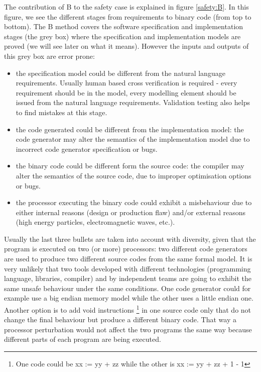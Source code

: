 The contribution of B to the safety case is explained in figure \ref{safety:B}. In this figure, we see the different stages from requirements to binary code (from top to bottom). The B method covers the software specification and implementation stages (the grey box) where the specification and implementation models are proved (we will see later on what it means). However the inputs and outputs of this grey box are error prone:
\begin{itemize}
    \item the specification model could be different from the natural language requirements. Usually human based cross verification is required - every requirement should be in the model, every modelling element should be issued from the natural language requirements. Validation testing also helps to find mistakes at this stage.
    \item the code generated could be different from the implementation model: the code generator may alter the semantics of the implementation model due to incorrect code generator specification or bugs.
    \item the binary code could be different form the source code: the compiler may alter the semantics of the source code, due to improper optimisation options or bugs.
    \item the processor executing the binary code could exhibit a misbehaviour due to either internal reasons (design or production flaw) and/or external reasons (high energy particles, electromagnetic waves, etc.).\\
\end{itemize}

Usually the last three bullets are taken into account with diversity, given that the program is executed on two (or more) processors: two different code generators are used to produce two different source codes from the same formal model. It is very unlikely that two tools developed with different technologies (programming language, libraries, compiler) and by independent teams are going to exhibit the same unsafe behaviour under the same conditions. One code generator could for example use a big endian memory model while the other uses a little endian one. Another option is to add void instructions \footnote{One code could be xx := yy + zz while the other is xx := yy + zz + 1 - 1 } in one source code only that do not change the final behaviour but produce a different binary code. That way a processor perturbation would not affect the two programs the same way because different parts of each program are being executed.\\

